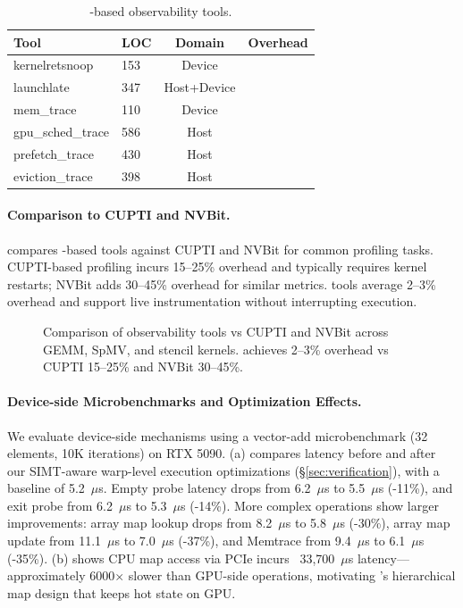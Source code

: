 \begin{table}[t]
\centering
\small
\begin{tabularx}{\columnwidth}{@{} X l c c @{}}
\toprule
\textbf{Tool} & \textbf{LOC} & \textbf{Domain} & \textbf{Overhead} \\
\midrule
kernelretsnoop & 153 & Device & \\
launchlate & 347 & Host+Device & \\
mem\_trace & 110 & Device & \\
gpu\_sched\_trace & 586 & Host & \\
prefetch\_trace & 430 & Host & \\
eviction\_trace & 398 & Host & \\
\bottomrule
\end{tabularx}
\caption{\sys-based observability tools.}
\label{tab:obs-overhead}
\end{table}

\paragraph{Comparison to CUPTI and NVBit.}
 compares \sys-based tools against CUPTI and
NVBit for common profiling tasks. CUPTI-based profiling incurs 15--25\%
overhead and typically requires kernel restarts; NVBit adds 30--45\%
overhead for similar metrics. \sys tools average 2--3\% overhead and support
live instrumentation without interrupting execution.

\begin{figure}
\centering
{}
\caption{Comparison of \sys observability tools vs CUPTI and NVBit across GEMM, SpMV, and stencil kernels. \sys achieves 2--3\% overhead vs CUPTI 15--25\% and NVBit 30--45\%.}
\label{fig:obs-comparison}
\end{figure}

\paragraph{Device-side Microbenchmarks and Optimization Effects.}
We evaluate device-side \sys mechanisms using a vector-add microbenchmark (32 elements, 10K iterations) on RTX 5090. (a) compares latency before and after our SIMT-aware warp-level execution optimizations (\S\ref{sec:verification}), with a baseline of 5.2~$\mu$s. Empty probe latency drops from 6.2~$\mu$s to 5.5~$\mu$s (-11\%), and exit probe from 6.2~$\mu$s to 5.3~$\mu$s (-14\%). More complex operations show larger improvements: array map lookup drops from 8.2~$\mu$s to 5.8~$\mu$s (-30\%), array map update from 11.1~$\mu$s to 7.0~$\mu$s (-37\%), and Memtrace from 9.4~$\mu$s to 6.1~$\mu$s (-35\%). (b) shows CPU map access via PCIe incurs ~33,700~$\mu$s latency---approximately 6000$\times$ slower than GPU-side operations, motivating \sys's hierarchical map design that keeps hot state on GPU.

